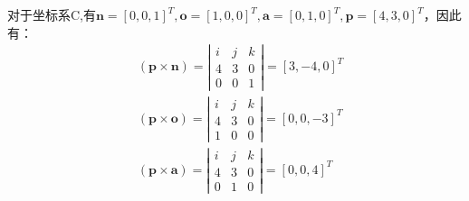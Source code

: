 \documentclass{ctexart}
\begin{document}
对于坐标系{C},有$\mathbf{n}=[0,0,1]^T, \mathbf{o}=[1,0,0]^T, \mathbf{a}=[0,1,0]^T, \mathbf{p}=[4,3,0]^T$，因此有：
\begin{equation}
	\begin{aligned}
		&(\mathbf{p} \times \mathbf{n})=\left| \begin{matrix}
			i & j & k \\
			4 & 3 & 0 \\
			0 & 0 & 1
		\end{matrix} \right| = [3,-4,0]^T \\
		&(\mathbf{p} \times \mathbf{o})=\left| \begin{matrix}
			i & j & k \\
			4 & 3 & 0 \\
			1 & 0 & 0
		\end{matrix} \right| = [0,0,-3]^T \\
		&(\mathbf{p} \times \mathbf{a})=\left| \begin{matrix}
			i & j & k \\
			4 & 3 & 0 \\
			0 & 1 & 0
		\end{matrix} \right| = [0,0,4]^T
	\end{aligned}
\end{equation}
\end{document}
